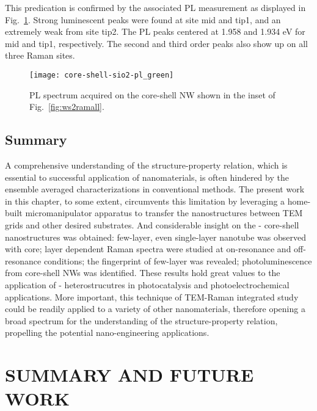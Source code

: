This predication is confirmed by the associated PL measurement as displayed in Fig.~\ref{fig:ws2plgreen}. Strong luminescent peaks were found at site mid and tip1, and an extremely weak from site tip2. The PL peaks centered at 1.958 and 1.934 eV for mid and tip1, respectively. The second and third order peaks also show up on all three Raman sites. 
\begin{figure}[htb]
\centering
\texttt{[image: core-shell-sio2-pl\_green]}
\caption[PL spectra of - on -Si]{PL spectrum acquired on the core-shell NW shown in the inset of Fig.~\ref{fig:ws2ramall}.}
\label{fig:ws2plgreen}
\end{figure}

\section{Summary} 

A comprehensive understanding of the structure-property relation, which is essential to successful application of nanomaterials, is often hindered by the ensemble averaged characterizations in conventional methods. The present work in this chapter, to some extent, circumvents this limitation by leveraging a home-built micromanipulator apparatus to transfer the nanostructures between TEM grids and other desired substrates. And considerable insight on the - core-shell nanostructures was obtained: few-layer, even single-layer  nanotube was observed with  core; layer dependent Raman spectra were studied at on-resonance and off-resonance conditions; the fingerprint of few-layer  was revealed; photoluminescence from core-shell NWs was identified. These results hold great values to the application of - heterostrucutres in photocatalysis and photoelectrochemical applications. More important, this technique of TEM-Raman integrated study could be readily applied to a variety of other nanomaterials, therefore opening a broad spectrum for the understanding of the structure-property relation, propelling the potential nano-engineering applications. 

\chapter{SUMMARY AND FUTURE WORK}


